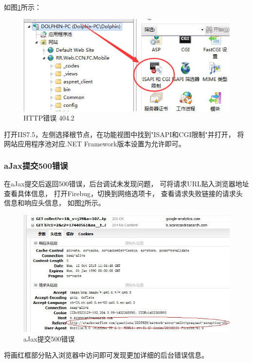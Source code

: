 \documentclass{book}
\begin{document}
如图\ref{fig:ISAPIAndCGI}所示：

\begin{figure}[htbp]
	\centering
	\includegraphics[scale=0.8]{ISAPIAndCGI.png}
	\caption{HTTP错误 404.2}
	\label{fig:ISAPIAndCGI}
\end{figure}

打开IIS7.5，左侧选择根节点，在功能视图中找到"ISAPI和CGI限制"并打开，
将网站应用程序池对应.NET Framework版本设置为允许即可。

\subsubsection{aJax提交500错误}

在aJax提交后返回500错误，后台调试未发现问题，
可将请求URL贴入浏览器地址查看具体信息，
打开Firebug，切换到网络选项卡，
查看请求失败链接的请求头信息和响应头信息，
如图\ref{fig:CheckRequestAndResponseInfo}所示。

\begin{figure}[htbp]
	\centering
	\includegraphics[scale=0.8]{CheckRequestAndResponseInfo.jpg}
	\caption{aJax提交500错误}
	\label{fig:CheckRequestAndResponseInfo}
\end{figure}

将画红框部分贴入浏览器中访问即可发现更加详细的后台错误信息。
\end{document}
